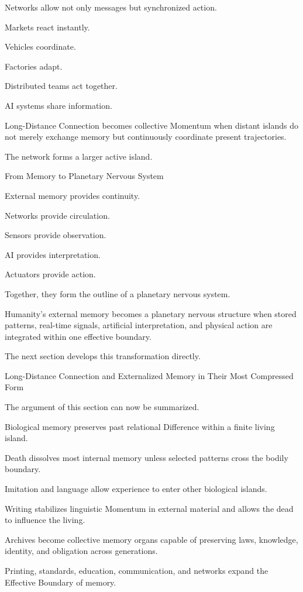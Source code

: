 Networks allow not only messages but synchronized action.

Markets react instantly.

Vehicles coordinate.

Factories adapt.

Distributed teams act together.

AI systems share information.

Long-Distance Connection becomes collective Momentum when distant islands do not merely exchange memory but continuously coordinate present trajectories.

The network forms a larger active island.

From Memory to Planetary Nervous System

External memory provides continuity.

Networks provide circulation.

Sensors provide observation.

AI provides interpretation.

Actuators provide action.

Together, they form the outline of a planetary nervous system.

Humanity’s external memory becomes a planetary nervous structure when stored patterns, real-time signals, artificial interpretation, and physical action are integrated within one effective boundary.

The next section develops this transformation directly.

Long-Distance Connection and Externalized Memory in Their Most Compressed Form

The argument of this section can now be summarized.

Biological memory preserves past relational Difference within a finite living island.

Death dissolves most internal memory unless selected patterns cross the bodily boundary.

Imitation and language allow experience to enter other biological islands.

Writing stabilizes linguistic Momentum in external material and allows the dead to influence the living.

Archives become collective memory organs capable of preserving laws, knowledge, identity, and obligation across generations.

Printing, standards, education, communication, and networks expand the Effective Boundary of memory.

